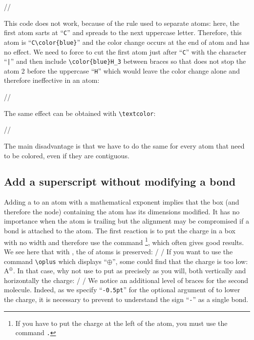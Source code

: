 \documentclass[10pt]{article}
\begin{document}
//

This code does not work, because of the rule used to separate atoms: here, the first atom sarts at ``\verb-C-'' and spreads to the next uppercase letter. Therefore, this atom is ``\verb-C\color{blue}-'' and the color change occurs at the end of atom and has no effect. We need to force \CF to cut the first atom just after ``\verb-C-'' with the character ``\verb-|-'' and then include \verb-\color{blue}H_3- between braces so that \CF does not stop the atom 2 before the uppercase ``\verb-H-'' which would leave the color change alone and therefore ineffective in an atom:

//

The same effect can be obtained with \verb-\textcolor-:

//

The main disadvantage is that we have to do the same for every atom that need to be colored, even if they are contiguous.

\subsection{Add a superscript without modifying a bond}
Adding a  to an atom with a mathematical exponent implies that the box (and therefore the \TIKZ node) containing the atom has its dimensions modified. It has no importance when the atom is trailing but the alignment may be compromised if a bond is attached to the atom. The first reaction is to put the charge in a box with no width and therefore use the command \idx\rlap\footnote{If you have to put the charge at the left of the atom, you must use the command \texttt{\string\llap.}}, which often gives good results. We see here that with \idx\rlap, the  of atoms is preserved:
/
\qquad
{}/
If you want to use the command \verb-\oplus- which displays ``$\oplus$'', some could find that the charge is too low: $\mathrm{A^\oplus}$. In that case, why not use \idx{\chemabove} to put as precisely as you will, both vertically and horizontally the charge:
/
\qquad
{}/
We notice an additional level of braces for the second molecule. Indeed, as we specify ``\verb/-0.5pt/'' for the optional argument of \idx{\chemabove} to lower the charge, it is necessary to prevent \CF to understand the sign ``\verb/-/'' as a single bond.
\end{document}
